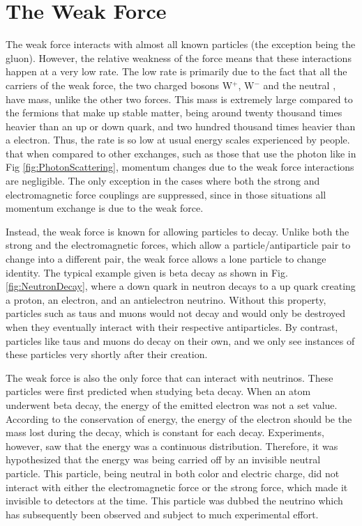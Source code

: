 \section{The Weak Force}
	The weak force interacts with almost all known particles (the exception being the gluon). However, the relative weakness of the force means that these interactions happen at a very low rate. The low rate is primarily due to the fact that all the carriers of the weak force, the two charged bosons W$^+$, W$^-$ and the neutral \Z, have mass, unlike the other two forces. This mass is extremely large compared to the fermions that make up stable matter, being around twenty thousand times heavier than an up or down quark, and two hundred thousand times heavier than a electron. Thus, the rate is so low at usual energy scales experienced by people. that when compared to other exchanges, such as those that use the photon like in Fig \ref{fig:PhotonScattering}, momentum changes due to the weak force interactions are negligible. The only exception in the cases where both the strong and electromagnetic force couplings are suppressed, since in those situations all momentum exchange is due to the weak force. 
	
	Instead, the weak force is known for allowing particles to decay. Unlike both the strong and the electromagnetic forces, which allow a particle/antiparticle pair to change into a different pair, the weak force allows a lone particle to change identity. The typical example given is beta decay as shown in Fig. \ref{fig:NeutronDecay}, where a down quark in neutron decays to a up quark creating a proton, an electron, and an antielectron neutrino. Without this property, particles such as taus and muons would not decay and would only be destroyed when they eventually interact with their respective antiparticles. By contrast, particles like taus and muons do decay on their own, and we only see instances of these particles very shortly after their creation.
    
    The weak force is also the only force that can interact with neutrinos. These particles were first predicted when studying beta decay. When an atom underwent beta decay, the energy of the emitted electron was not a set value. According to the conservation of energy, the energy of the electron should be the mass lost during the decay, which is constant for each decay. Experiments, however, saw that the energy was a continuous distribution. Therefore, it was hypothesized that the energy  was being carried off by an invisible neutral particle. This particle, being neutral in both color and electric charge, did not interact with either the electromagnetic force or the strong force, which made it invisible to detectors at the time. This particle was dubbed the neutrino which has subsequently been observed and subject to much experimental effort.
    
